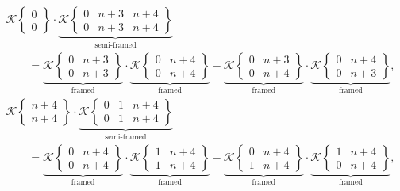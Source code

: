\documentclass[pdftex]{sigma}
\numberwithin{equation}{section}
\begin{document}
		\begin{gather}%
\mathscr{K}\left\lbrace \begin{matrix} 0 \\ 0 \end{matrix} \right\rbrace
			\cdot \underbrace{ \mathscr{K}\left\lbrace \begin{matrix} 0 & n+3 & n+4 \\ 0 & n+3 & n+4 \end{matrix} \right\rbrace }_{\text{semi-framed}}\nonumber\\
\qquad = \underbrace{\mathscr{K}\left\lbrace \begin{matrix} 0 & n+3 \\ 0 & n+3 \end{matrix} \right\rbrace}_{\text{framed}} \cdot \underbrace{\mathscr{K}\left\lbrace \begin{matrix} 0 & n+4 \\ 0 & n+4 \end{matrix} \right\rbrace}_{\text{framed}} - \underbrace{\mathscr{K}\left\lbrace \begin{matrix} 0 & n+3 \\ 0 & n+4 \end{matrix} \right\rbrace}_{\text{framed}} \cdot \underbrace{\mathscr{K}\left\lbrace \begin{matrix} 0 & n+4 \\ 0 & n+3 \end{matrix} \right\rbrace}_{\text{framed}},\label{DODGSON framed CC}
\\
\mathscr{K}\left\lbrace \begin{matrix} n+4 \\ n+4 \end{matrix} \right\rbrace
			\cdot \underbrace{ \mathscr{K}\left\lbrace \begin{matrix} 0 & 1 & n+4 \\ 0 & 1 & n+4 \end{matrix} \right\rbrace }_{\text{semi-framed}} \nonumber\\
\qquad= \underbrace{\mathscr{K}\left\lbrace \begin{matrix} 0 & n+4 \\ 0 & n+4 \end{matrix} \right\rbrace}_{\text{framed}} \cdot \underbrace{\mathscr{K}\left\lbrace \begin{matrix} 1 & n+4 \\ 1 & n+4 \end{matrix} \right\rbrace}_{\text{framed}} - \underbrace{\mathscr{K}\left\lbrace \begin{matrix} 0 & n+4 \\ 1 & n+4 \end{matrix} \right\rbrace}_{\text{framed}} \cdot \underbrace{\mathscr{K}\left\lbrace \begin{matrix} 1 & n+4 \\ 0 & n+4 \end{matrix} \right\rbrace}_{\text{framed}},\nonumber

\end{gather}
\end{document}
